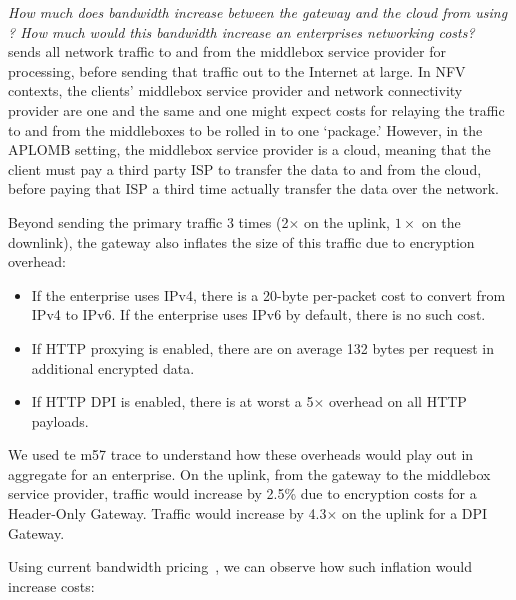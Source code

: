 {\it How much does bandwidth increase between the gateway and the cloud from using \sys? How much would this bandwidth increase an enterprises networking costs?}
\sys sends all network traffic to and from the middlebox service provider for processing, before sending that traffic out to the Internet at large. In NFV contexts, the clients' middlebox service provider and network connectivity provider are one and the same and one might expect costs for relaying the traffic to and from the middleboxes to be rolled in to one `package.' 
However, in the APLOMB setting, the middlebox service provider is a cloud, meaning that the client must pay a third party ISP to transfer the data to and from the cloud, before paying that ISP a third time actually transfer the data over the network.

Beyond sending the primary traffic 3 times (2$\times$ on the uplink, $1\times$ on the downlink), the gateway also inflates the size of this traffic due to encryption overhead:
\begin{itemize}
  \item If the enterprise uses IPv4, there is a 20-byte per-packet cost to convert from IPv4 to IPv6. If the enterprise uses IPv6 by default, there is no such cost.
  \item If HTTP proxying is enabled, there are on average 132 bytes per request in additional encrypted data.
  \item If HTTP DPI is enabled, there is at worst a 5$\times$ overhead on all HTTP payloads.
\end{itemize}
We used te m57 trace to understand how these overheads would play out in aggregate for an enterprise.
On the uplink, from the gateway to the middlebox service provider, traffic would increase by 2.5\% due to encryption costs for a Header-Only Gateway. Traffic would increase by 4.3$\times$ on the uplink for a DPI Gateway. 

Using current bandwidth pricing~\cite{comcast-costs, megapath-costs, verizon-costs}, we can observe how such inflation would increase costs: 

